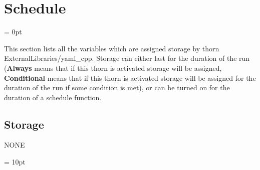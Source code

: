 
\section{Schedule} 


\parskip = 0pt


\noindent This section lists all the variables which are assigned storage by thorn ExternalLibraries/yaml\_cpp.  Storage can either last for the duration of the run ({\bf Always} means that if this thorn is activated storage will be assigned, {\bf Conditional} means that if this thorn is activated storage will be assigned for the duration of the run if some condition is met), or can be turned on for the duration of a schedule function.


\subsection*{Storage}NONE

\vspace{5mm}\parskip = 10pt 
